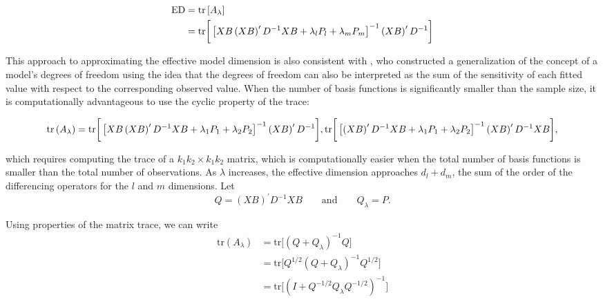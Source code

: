 \begin{align}
\begin{split} \label{eq:trace-of-the-smoothing-matrix}
\textup{ED} &= \textup{tr} \left[ A_\lambda \right]\\
&= \textup{tr}\bigg[\left[XB \left(XB\right)^\prime D^{-1}XB +  \lambda_l P_l+ \lambda_m P_m\right]^{-1} \left(X B\right)^\prime D^{-1}  \bigg]
\end{split}
\end{align}

\noindent
This approach to approximating the effective model dimension is also consistent with \cite{ye1998measuring}, who constructed a generalization of the concept of a model's degrees of freedom using the idea that the degrees of freedom can also be interpreted as the sum of the sensitivity of each fitted value with respect to the corresponding observed value.  When the number of basis functions is significantly smaller than the sample size, it is computationally advantageous to use the cyclic property of the trace: 

\begin{align*}
\textup{tr}\left( A_\lambda \right) = \textup{tr}\bigg[\left[  XB  \left(XB\right)^\prime D^{-1}XB +  \lambda_1 P_1+ \lambda_2 P_2\right]^{-1} \left(X B\right)^\prime D^{-1} \bigg],
\textup{tr}\bigg[\left[ \left(XB\right)^\prime D^{-1}XB +  \lambda_1 P_1+ \lambda_2 P_2\right]^{-1} \left(X B\right)^\prime D^{-1} XB  \bigg],
\end{align*}

\noindent
which requires computing the trace of a $k_1k_2 \times k_1k_2$ matrix, which is computationally easier when the total number of basis functions is smaller than the total number of observations. As $\lambda$ increases, the effective dimension approaches $d_l + d_m$, the sum of the order of the differencing operators for the $l$ and $m$ dimensions.  Let
\begin{equation*}
Q = \left(X B\right)^\prime D^{-1} XB \qquad \mbox{and} \qquad Q_\lambda = P.
\end{equation*}

Using properties of the matrix trace, we can write
\begin{align*}
\mbox{tr}\left(A_\lambda \right) &= \mbox{tr}\bigg[ \left(Q + Q_\lambda \right)^{-1}Q \bigg]\\
&=\mbox{tr}\bigg[ Q^{1/2}\left(Q + Q_\lambda \right)^{-1}Q^{1/2} \bigg] \\
&=\mbox{tr}\bigg[\left(I + Q^{-{1/2}}Q_\lambda Q^{-{1/2}} \right)^{-1} \bigg]
\end{align*}

